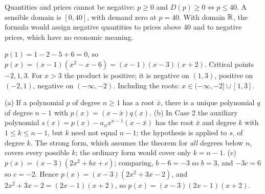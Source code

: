Quantities and prices cannot be negative: $p\ge0$ and $D(p)\ge0\Leftrightarrow p\le40$. A sensible domain is $[0,40]$, with
demand zero at $p=40$. With domain $\mathbb{R}$, the formula would assign negative quantities to prices above $40$ and to negative
prices, which have no economic meaning.

$p(1)=1-2-5+6=0$, so $p(x)=(x-1)(x^2-x-6)=(x-1)(x-3)(x+2)$. Critical points $-2,1,3$. For $x>3$ the product is positive;
it is negative on $(1,3)$, positive on $(-2,1)$, negative on $(-\infty,-2)$. Including the roots:
$x\in(-\infty,-2]\cup[1,3]$.

(a) If a polynomial $p$ of degree $n\ge1$ has a root $\bar x$, there is a unique polynomial $q$ of degree $n-1$ with
$p(x)=(x-\bar x)q(x)$.
(b) In Case 2 the auxiliary polynomial $s(x)=p(x)-a_nx^{n-1}(x-\bar x)$ has the root $\bar x$ and degree $k$ with
$1\le k\le n-1$, but $k$ need not equal $n-1$; the hypothesis is applied to $s$, of degree $k$. The strong form, which
assumes the theorem for \emph{all} degrees below $n$, covers every possible $k$; the ordinary form would cover only
$k=n-1$.
(c) $p(x)=(x-3)(2x^2+bx+c)$; comparing, $b-6=-3$ so $b=3$, and $-3c=6$ so $c=-2$. Hence $p(x)=(x-3)(2x^2+3x-2)$, and
$2x^2+3x-2=(2x-1)(x+2)$, so $p(x)=(x-3)(2x-1)(x+2)$.
